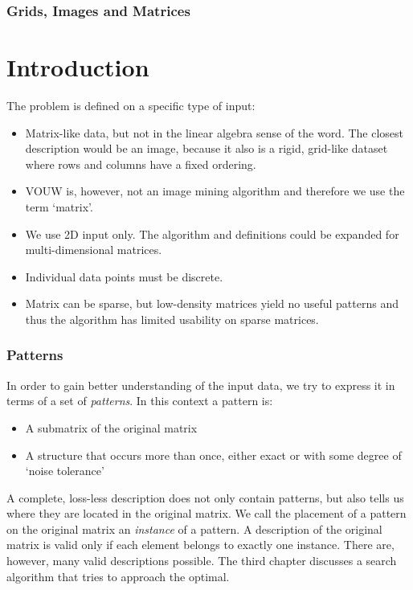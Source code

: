 \documentclass[a4paper,notoc,oneside]{tufte-book}
\begin{document}
\subsection{Grids, Images and Matrices}

\chapter{Introduction}
The problem is defined on a specific type of input:
\begin{itemize}
\item Matrix-like data, but not in the linear algebra sense of the word. The closest description would be an image, because it also is a rigid, grid-like dataset where rows and columns have a fixed ordering.
\item VOUW is, however, not an image mining algorithm and therefore we use the term `matrix'.
\item We use 2D input only. The algorithm and definitions could be expanded for multi-dimensional matrices. 
\item Individual data points must be discrete.
\item Matrix can be sparse, but low-density matrices yield no useful patterns and thus the algorithm has limited usability on sparse matrices.
\end{itemize}

\subsection{Patterns}

In order to gain better understanding of the input data, we try to express it in terms of a set of \emph{patterns}. In this context a pattern is:
\begin{itemize}
\item A submatrix of the original matrix
\item A structure that occurs more than once, either exact or with some degree of `noise tolerance'
\end{itemize} 
A complete, loss-less description does not only contain patterns, but also tells us where they are located in the original matrix. We call the placement of a pattern on the original matrix an \emph{instance} of a pattern. A description of the original matrix is valid only if each element belongs to exactly one instance. There are, however, many valid descriptions possible. The third chapter discusses a search algorithm that tries to approach the optimal.
\end{document}
